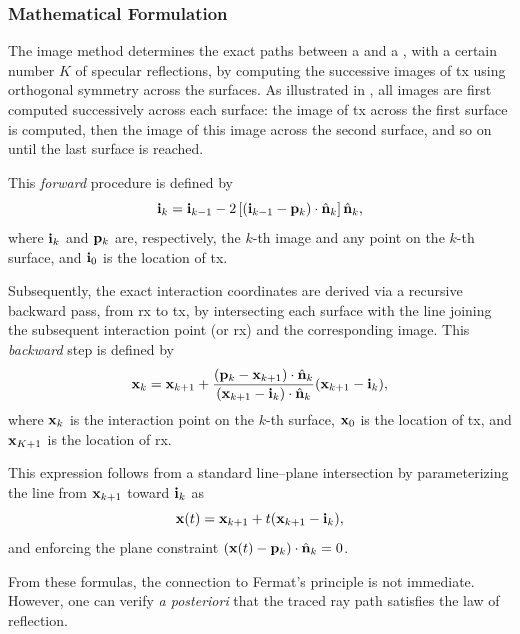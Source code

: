 \subsubsection{Mathematical Formulation}

The image method determines the exact paths between a  and a , with a certain number $K$ of specular reflections, by computing the successive images of \gls{tx} using orthogonal symmetry across the surfaces. As illustrated in , all images are first computed successively across each surface: the image of \gls{tx} across the first surface is computed, then the image of this image across the second surface, and so on until the last surface is reached.

This \emph{forward} procedure is defined by
\begin{equation}
  \mathbf{i}_k = \mathbf{i}_{k-1} - 2\left[\left(\mathbf{i}_{k-1} - \mathbf{p}_k\right)\cdot\hat{\mathbf{n}}_k\right]\hat{\mathbf{n}}_k,
\end{equation}
where $\mathbf{i}_k$ and $\mathbf{p}_k$ are, respectively, the $k$-th image and any point on the $k$-th surface, and $\mathbf{i}_0$ is the location of \gls{tx}.

Subsequently, the exact interaction coordinates are derived via a recursive backward pass, from \gls{rx} to \gls{tx}, by intersecting each surface with the line joining the subsequent interaction point (or \gls{rx}) and the corresponding image. This \emph{backward} step is defined by
\begin{equation}
  \mathbf{x}_k = \mathbf{x}_{k+1} + \frac{\left(\mathbf{p}_k - \mathbf{x}_{k+1}\right)\cdot\hat{\mathbf{n}}_k}{\left(\mathbf{x}_{k+1} - \mathbf{i}_k\right)\cdot\hat{\mathbf{n}}_k} (\mathbf{x}_{k+1} - \mathbf{i}_k),
\end{equation}
where $\mathbf{x}_k$ is the interaction point on the $k$-th surface, $\mathbf{x}_0$ is the location of \gls{tx}, and $\mathbf{x}_{K+1}$ is the location of \gls{rx}.

This expression follows from a standard line--plane intersection by parameterizing the line from $\mathbf{x}_{k+1}$ toward $\mathbf{i}_k$ as
\begin{equation}
  \mathbf{x}(t)=\mathbf{x}_{k+1}+t(\mathbf{x}_{k+1}-\mathbf{i}_k),
\end{equation}
and enforcing the plane constraint $(\mathbf{x}(t)-\mathbf{p}_k)\cdot\hat{\mathbf{n}}_k=0$.

From these formulas, the connection to Fermat's principle is not immediate. However, one can verify \emph{a posteriori} that the traced ray path satisfies the law of reflection.


